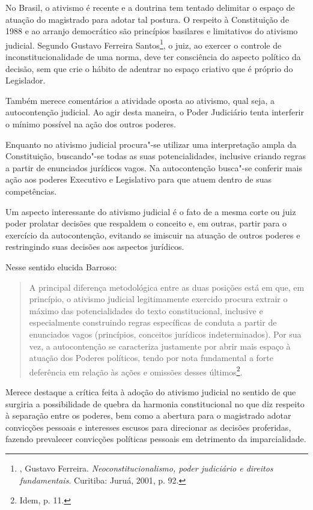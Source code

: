 No Brasil, o ativismo é recente e a doutrina tem tentado
delimitar o espaço de atuação do magistrado para adotar tal postura. O
respeito à Constituição de 1988 e ao arranjo democrático são princípios
basilares e limitativos do ativismo judicial. Segundo Gustavo Ferreira
Santos\footnote{, Gustavo Ferreira. \emph{Neoconstitucionalismo,
  poder judiciário e direitos fundamentais}. Curitiba: Juruá,
  2001, p. 92.}, o juiz, ao exercer o controle de inconstitucionalidade de
uma norma, deve ter consciência do aspecto político da decisão, sem que
crie o hábito de adentrar no espaço criativo que é próprio do
Legislador.

Também merece comentários a atividade oposta ao ativismo, qual seja, a
autocontenção judicial. Ao agir desta maneira, o Poder Judiciário tenta
interferir o mínimo possível na ação dos outros poderes.

Enquanto no ativismo judicial procura"-se utilizar uma interpretação
ampla da Constituição, buscando"-se todas as suas potencialidades,
inclusive criando regras a partir de enunciados jurídicos vagos. Na
autocontenção busca"-se conferir mais ação aos poderes Executivo e
Legislativo para que atuem dentro de suas competências.

Um aspecto interessante do ativismo judicial é o fato de a mesma corte
ou juiz poder prolatar decisões que respaldem o conceito e, em outras,
partir para o exercício da autocontenção, evitando se imiscuir na
atuação de outros poderes e restringindo suas decisões aos aspectos
jurídicos.

Nesse sentido elucida Barroso:

\begin{quote}
A principal diferença metodológica entre as duas posições está em que,
em princípio, o ativismo judicial legitimamente exercido procura extrair
o máximo das potencialidades do texto constitucional, inclusive e
especialmente construindo regras específicas de conduta a partir de
enunciados vagos (princípios, conceitos jurídicos indeterminados). Por
sua vez, a autocontenção se caracteriza justamente por abrir mais espaço
à atuação dos Poderes políticos, tendo por nota fundamental a forte
deferência em relação às ações e omissões desses últimos\footnote{Idem, p. 11.}.
\end{quote}

Merece destaque a crítica feita à adoção do ativismo judicial no sentido
de que surgiria a possibilidade de quebra da harmonia constitucional no
que diz respeito à separação entre os poderes, bem como a abertura para
o magistrado adotar convicções pessoais e interesses escusos para
direcionar as decisões proferidas, fazendo prevalecer convicções
políticas pessoais em detrimento da imparcialidade.

